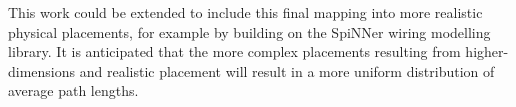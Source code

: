 			This work could be extended to include this final mapping into more
			realistic physical placements, for example by building on the SpiNNer
			wiring modelling library. It is anticipated that the more complex
			placements resulting from higher-dimensions and realistic placement will
			result in a more uniform distribution of average path lengths.
	




